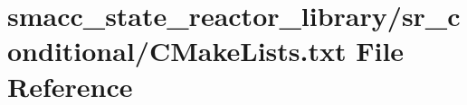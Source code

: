 \hypertarget{state__reactor__library_2sr__conditional_2CMakeLists_8txt}{}\section{smacc\+\_\+state\+\_\+reactor\+\_\+library/sr\+\_\+conditional/\+C\+Make\+Lists.txt File Reference}
\label{state__reactor__library_2sr__conditional_2CMakeLists_8txt}
